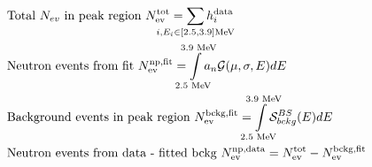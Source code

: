 \documentclass[10pt]{article}
\begin{document}
\begin{align*}&\text{Total $N_{ev}$ in peak region } N^\text{tot}_\text{ev} = \sum_{\mathclap{i, E_i \in [2.5, 3.9] \text{MeV}}}h^\text{data}_i \\
&\text{Neutron events from fit } N^\text{np,fit}_\text{ev} = \int\limits_{\mathclap{2.5 \text{ MeV}}}^{\mathclap{3.9 \text{ MeV}}}a_n \mathcal{G}(\mu, \sigma, E)dE \\
&\text{Background events in peak region } N^\text{bckg,fit}_\text{ev} = \int\limits_{\mathclap{2.5 \text{ MeV}}}^{\mathclap{3.9 \text{ MeV}}}\mathcal{S}^{BS}_{bckg}(E)dE \\
&\text{Neutron events from data - fitted bckg } N^\text{np,data}_\text{ev} = N^\text{tot}_\text{ev} - N^\text{bckg,fit}_\text{ev}
\end{align*}
\end{document}
